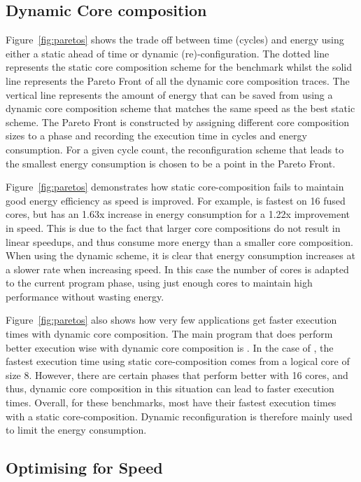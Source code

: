 \subsection{Dynamic Core composition}
Figure~\ref{fig:paretos} shows the trade off between time (cycles) and energy using either a static ahead of time or dynamic (re)-configuration.
The dotted line represents the static core composition scheme for the benchmark whilst the solid line represents the Pareto Front of all the dynamic core composition traces.
The vertical line represents the amount of energy that can be saved from using a dynamic core composition scheme that matches the same speed as the best static scheme.
The Pareto Front is constructed by assigning different core composition sizes to a phase and recording the execution time in cycles and energy consumption.
For a given cycle count, the reconfiguration scheme that leads to the smallest energy consumption is chosen to be a point in the Pareto Front.

Figure~\ref{fig:paretos} demonstrates how static core-composition fails to maintain good energy efficiency as speed is improved.
For example,  is fastest on 16 fused cores, but has an 1.63x increase in energy consumption for a 1.22x improvement in speed.
This is due to the fact that larger core compositions do not result in linear speedups, and thus consume more energy than a smaller core composition.
When using the dynamic scheme, it is clear that energy consumption increases at a slower rate when increasing speed.
In this case the number of cores is adapted to the current program phase, using just enough cores to maintain high performance without wasting energy.

Figure~\ref{fig:paretos} also shows how very few applications get faster execution times with dynamic core composition.
The main program that does perform better execution wise with dynamic core composition is .
In the case of , the fastest execution time using static core-composition comes from a logical core of size 8.
However, there are certain phases that perform better with 16 cores, and thus, dynamic core composition in this situation can lead to faster execution times.
Overall, for these benchmarks, most have their fastest execution times with a static core-composition.
Dynamic reconfiguration is therefore mainly used to limit the energy consumption.

\subsection{Optimising for Speed} \label{sec:dyn:speed}

